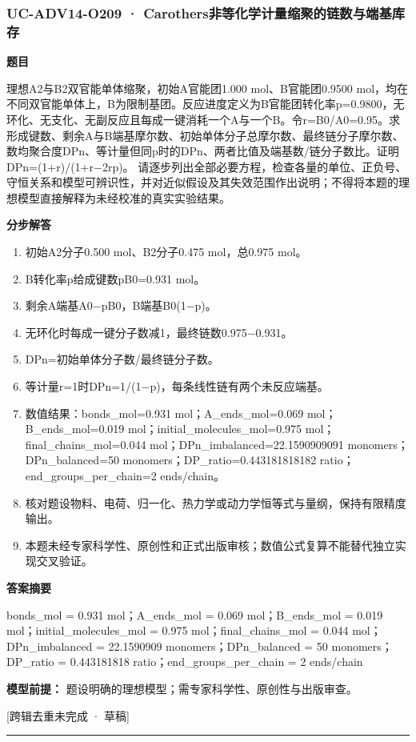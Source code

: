 \documentclass[UTF8,11pt,a4paper]{ctexart}
\begin{document}
\subsubsection*{UC-ADV14-O209 · Carothers非等化学计量缩聚的链数与端基库存}
\noindent\textbf{题目}\par
理想A2与B2双官能单体缩聚，初始A官能团1.000 mol、B官能团0.9500 mol，均在不同双官能单体上，B为限制基团。反应进度定义为B官能团转化率p=0.9800，无环化、无支化、无副反应且每成一键消耗一个A与一个B。令r=B0/A0=0.95。求形成键数、剩余A与B端基摩尔数、初始单体分子总摩尔数、最终链分子摩尔数、数均聚合度DPn、等计量但同p时的DPn、两者比值及端基数/链分子数比。证明DPn=(1+r)/(1+r−2rp)。 请逐步列出全部必要方程，检查各量的单位、正负号、守恒关系和模型可辨识性，并对近似假设及其失效范围作出说明；不得将本题的理想模型直接解释为未经校准的真实实验结果。\par
\medskip\noindent\textbf{分步解答}
\begin{enumerate}
\item 初始A2分子0.500 mol、B2分子0.475 mol，总0.975 mol。
\item B转化率p给成键数pB0=0.931 mol。
\item 剩余A端基A0−pB0，B端基B0(1−p)。
\item 无环化时每成一键分子数减1，最终链数0.975−0.931。
\item DPn=初始单体分子数/最终链分子数。
\item 等计量r=1时DPn=1/(1−p)，每条线性链有两个未反应端基。
\item 数值结果：bonds\_mol=0.931 mol；A\_ends\_mol=0.069 mol；B\_ends\_mol=0.019 mol；initial\_molecules\_mol=0.975 mol；final\_chains\_mol=0.044 mol；DPn\_imbalanced=22.1590909091 monomers；DPn\_balanced=50 monomers；DP\_ratio=0.443181818182 ratio；end\_groups\_per\_chain=2 ends/chain。
\item 核对题设物料、电荷、归一化、热力学或动力学恒等式与量纲，保持有限精度输出。
\item 本题未经专家科学性、原创性和正式出版审核；数值公式复算不能替代独立实现交叉验证。
\end{enumerate}
\noindent\textbf{答案摘要}\par
bonds\_mol = 0.931 mol；A\_ends\_mol = 0.069 mol；B\_ends\_mol = 0.019 mol；initial\_molecules\_mol = 0.975 mol；final\_chains\_mol = 0.044 mol；DPn\_imbalanced = 22.1590909 monomers；DPn\_balanced = 50 monomers；DP\_ratio = 0.443181818 ratio；end\_groups\_per\_chain = 2 ends/chain\par
\noindent\textbf{模型前提：}
题设明确的理想模型；需专家科学性、原创性与出版审查。\par
\noindent\textcolor{red!65!black}{[跨辑去重未完成 · 草稿]} \par
\medskip\hrule\medskip
{}
\end{document}
